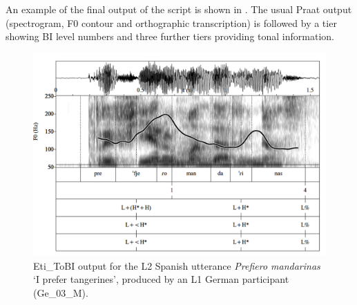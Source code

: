 An example of the final output of the script is shown in . The usual Praat output (spectrogram, F0 contour and orthographic transcription) is followed by a tier showing BI level numbers and three further tiers providing tonal information.




\begin{figure}
\includegraphics[width=\textwidth]{figures/a03HabilMethodology-img004-new.png}



\caption{Eti\_ToBI output for the L2 Spanish utterance \textit{Prefiero mandarinas} ‘I prefer tangerines’, produced by an L1 German participant (Ge\_03\_M).}
\label{fig:3.4}
\end{figure}



